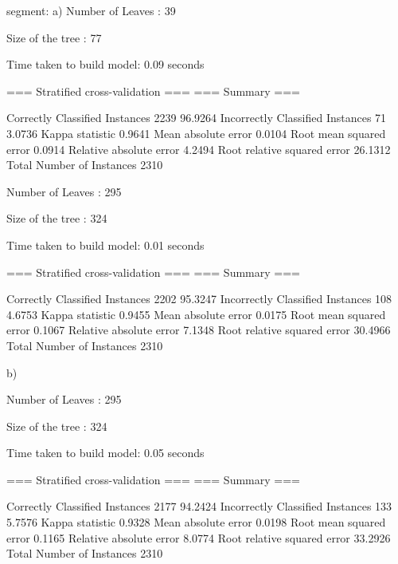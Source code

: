 segment:
a)
Number of Leaves  : 	39

Size of the tree : 	77


Time taken to build model: 0.09 seconds

=== Stratified cross-validation ===
=== Summary ===

Correctly Classified Instances        2239               96.9264 %
Incorrectly Classified Instances        71                3.0736 %
Kappa statistic                          0.9641
Mean absolute error                      0.0104
Root mean squared error                  0.0914
Relative absolute error                  4.2494 %
Root relative squared error             26.1312 %
Total Number of Instances             2310     


Number of Leaves  : 	295

Size of the tree : 	324


Time taken to build model: 0.01 seconds

=== Stratified cross-validation ===
=== Summary ===

Correctly Classified Instances        2202               95.3247 %
Incorrectly Classified Instances       108                4.6753 %
Kappa statistic                          0.9455
Mean absolute error                      0.0175
Root mean squared error                  0.1067
Relative absolute error                  7.1348 %
Root relative squared error             30.4966 %
Total Number of Instances             2310

b)

Number of Leaves  : 	295

Size of the tree : 	324


Time taken to build model: 0.05 seconds

=== Stratified cross-validation ===
=== Summary ===

Correctly Classified Instances        2177               94.2424 %
Incorrectly Classified Instances       133                5.7576 %
Kappa statistic                          0.9328
Mean absolute error                      0.0198
Root mean squared error                  0.1165
Relative absolute error                  8.0774 %
Root relative squared error             33.2926 %
Total Number of Instances             2310     





